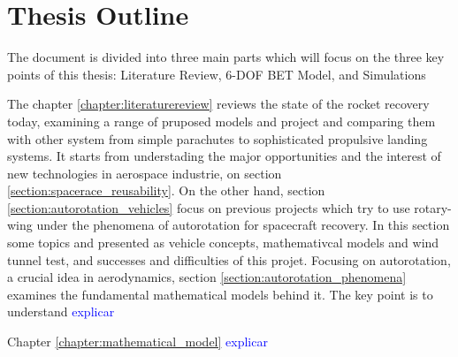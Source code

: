 \section{Thesis Outline}
\label{section:outline}

The document is divided into three main parts which will focus on the three key points of this thesis: Literature Review, 6-DOF BET Model, and Simulations

The chapter \ref{chapter:literaturereview} reviews the state of the rocket recovery today, examining a range of pruposed models and project and comparing them with other system from simple parachutes to sophisticated propulsive landing systems. It starts from understading the major opportunities and the interest of new technologies in aerospace industrie, on section \ref{section:spacerace_reusability}. On the other hand, section \ref{section:autorotation_vehicles} focus on previous projects which try to use rotary-wing under the phenomena of autorotation for spacecraft recovery. In this section some topics and presented as vehicle concepts, mathemativcal models and wind tunnel test, and successes and difficulties of this projet. Focusing on autorotation, a crucial idea in aerodynamics, section \ref{section:autorotation_phenomena} examines the fundamental mathematical models behind it. The key point is to understand \textcolor{blue}{explicar}


Chapter \ref{chapter:mathematical_model} \textcolor{blue}{explicar}
